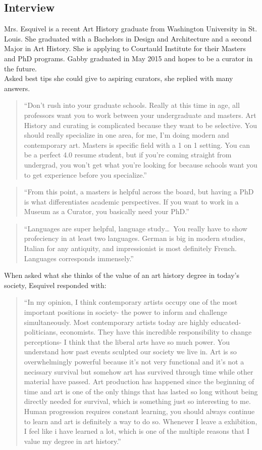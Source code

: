 \begin{multicols}{2}
\section{Interview}
	Mrs. Esquivel is a recent Art History graduate from Washington University in St. Louis. She graduated with a Bachelors in Design and Architecture and a second Major in Art History. She is applying to Courtauld Institute for their Masters and PhD programs. Gabby graduated in May 2015 and hopes to be a curator in the future. \\ 
	Asked best tips she could give to aspiring curators, she replied with many answers.
	\begin{quote}
		“Don’t rush into your graduate schools. Really at this time in age, all professors want you to work between your undergraduate and masters. Art History and curating is complicated because they want to be selective. You should really specialize in one area, for me, I’m doing modern and contemporary art. Masters is specific field with a 1 on 1 setting. You can be a perfect 4.0 resume student, but if you’re coming straight from undergrad, you won’t get what you’re looking for because schools want you to get experience before you specialize.”
	\end{quote}
	\begin{quote} 
		“From this point, a masters is helpful across the board, but having a PhD is what differentiates academic perspectives. If you want to work in a Museum as a Curator, you basically need your PhD.”
	\end{quote}
	\begin{quote}
		“Languages are super helpful, language study\ldots\ You really have to show profeciency in at least two languages. German is big in modern studies, Italian for any antiquity, and impressionist is most definitely French. Languages corresponds immensely.”
	\end{quote}
	When asked what she thinks of the value of an art history degree in today’s society, Esquivel responded with:
	\begin{quote}
		“In my opinion, I think contemporary artists occupy one of the most important positions in society- the power to inform and challenge simultaneously. Most contemporary artists today are highly educated- politicians, economists. They have this incredible responsibility to change perceptions- I think that the liberal arts have so much power. You understand how past events sculpted our society we live in. Art is so overwhelmingly powerful because it’s not very functional and it’s not a necissary survival but somehow art has survived through time while other material have passed. Art production has happened since the beginning of time and art is one of the only things that has lasted so long without being directly needed for survival, which is something just so interesting to me. Human progression requires constant learning, you should always continue to learn and art is definitely a way to do so. Whenever I leave a exhibition, I feel like i have learned a lot, which is one of the multiple reasons that I value my degree in art history.”
	\end{quote}


\end{multicols}
